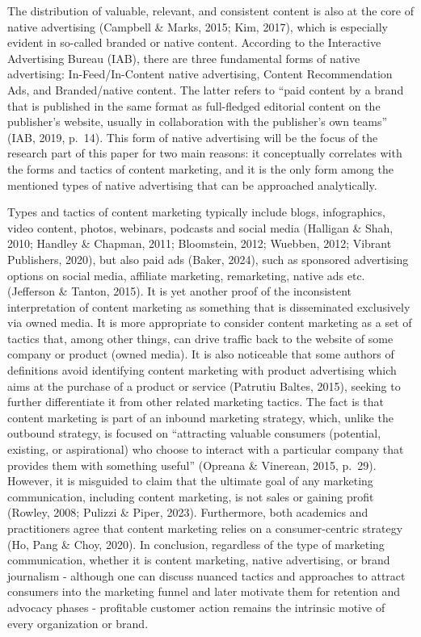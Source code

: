 \documentclass[preprint, 3p,
authoryear]{elsarticle} %
\begin{document}
The distribution of valuable, relevant, and consistent content is also
at the core of native advertising (Campbell \& Marks, 2015; Kim, 2017),
which is especially evident in so-called branded or native content.
According to the Interactive Advertising Bureau (IAB), there are three
fundamental forms of native advertising: In-Feed/In-Content native
advertising, Content Recommendation Ads, and Branded/native content. The
latter refers to ``paid content by a brand that is published in the same
format as full-fledged editorial content on the publisher's website,
usually in collaboration with the publisher's own teams'' (IAB, 2019,
p.~14). This form of native advertising will be the focus of the
research part of this paper for two main reasons: it conceptually
correlates with the forms and tactics of content marketing, and it is
the only form among the mentioned types of native advertising that can
be approached analytically.

Types and tactics of content marketing typically include blogs,
infographics, video content, photos, webinars, podcasts and social media
(Halligan \& Shah, 2010; Handley \& Chapman, 2011; Bloomstein, 2012;
Wuebben, 2012; Vibrant Publishers, 2020), but also paid ads (Baker,
2024), such as sponsored advertising options on social media, affiliate
marketing, remarketing, native ads etc. (Jefferson \& Tanton, 2015). It
is yet another proof of the inconsistent interpretation of content
marketing as something that is disseminated exclusively via owned media.
It is more appropriate to consider content marketing as a set of tactics
that, among other things, can drive traffic back to the website of some
company or product (owned media). It is also noticeable that some
authors of definitions avoid identifying content marketing with product
advertising which aims at the purchase of a product or service (Patrutiu
Baltes, 2015), seeking to further differentiate it from other related
marketing tactics. The fact is that content marketing is part of an
inbound marketing strategy, which, unlike the outbound strategy, is
focused on ``attracting valuable consumers (potential, existing, or
aspirational) who choose to interact with a particular company that
provides them with something useful'' (Opreana \& Vinerean, 2015,
p.~29). However, it is misguided to claim that the ultimate goal of any
marketing communication, including content marketing, is not sales or
gaining profit (Rowley, 2008; Pulizzi \& Piper, 2023). Furthermore, both
academics and practitioners agree that content marketing relies on a
consumer-centric strategy (Ho, Pang \& Choy, 2020). In conclusion,
regardless of the type of marketing communication, whether it is content
marketing, native advertising, or brand journalism - although one can
discuss nuanced tactics and approaches to attract consumers into the
marketing funnel and later motivate them for retention and advocacy
phases - profitable customer action remains the intrinsic motive of
every organization or brand.
\end{document}
